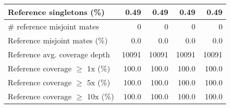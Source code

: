 \documentclass[12pt,a4paper]{article}
\begin{document}
\begin{table}[ht]
\begin{center}
\begin{tabular}{|l*{4}{|r}|}
Reference singletons (\%) & 0.49 & 0.49 & 0.49 & 0.49 \\ \hline
\# reference misjoint mates & 0 & 0 & 0 & 0 \\ \hline
Reference misjoint mates (\%) & 0.0 & 0.0 & 0.0 & 0.0 \\ \hline
Reference avg. coverage depth & 10091 & 10091 & 10091 & 10091 \\ \hline
Reference coverage $\geq$ 1x (\%) & 100.0 & 100.0 & 100.0 & 100.0 \\ \hline
Reference coverage $\geq$ 5x (\%) & 100.0 & 100.0 & 100.0 & 100.0 \\ \hline
Reference coverage $\geq$ 10x (\%) & 100.0 & 100.0 & 100.0 & 100.0 \\ \hline
\end{tabular}
\end{center}
\end{table}
\end{document}
